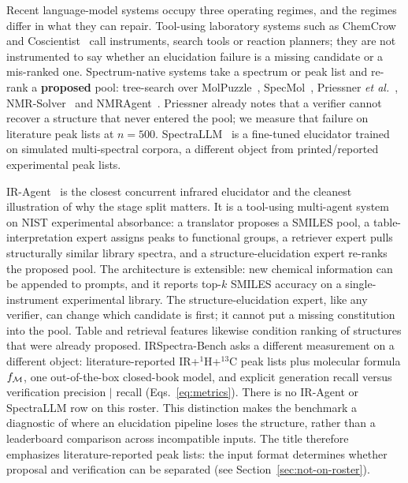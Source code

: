 \documentclass{article}
\begin{document}
Recent language-model systems occupy three operating regimes, and the
regimes differ in what they can repair.
Tool-using laboratory systems such as ChemCrow~\citep{mbran2024chemcrow}
and Coscientist~\citep{boiko2023coscientist} call instruments, search
tools or reaction planners; they are not instrumented to say whether an
elucidation failure is a missing candidate or a mis-ranked one.
Spectrum-native systems take a spectrum or peak list and re-rank a
\textbf{proposed} pool: tree-search over
MolPuzzle~\citep{zhuang2025treesearch}, SpecMol~\citep{shen2025specmol},
Priessner \textit{et al.}~\citep{priessner2026reasoning},
NMR-Solver~\citep{jin2025nmrsolver} and
NMRAgent~\citep{fang2026nmragent}.
Priessner already notes that a verifier cannot recover a structure that
never entered the pool; we measure that failure on literature peak lists
at $n{=}500$.
SpectraLLM~\citep{su2025spectrallm} is a fine-tuned elucidator trained on
simulated multi-spectral corpora, a different object from printed/reported
experimental peak lists.

IR-Agent~\citep{noh2025iragent} is the closest concurrent infrared
elucidator and the cleanest illustration of why the stage split matters.
It is a tool-using multi-agent system on NIST experimental absorbance: a
translator proposes a SMILES pool, a table-interpretation expert assigns
peaks to functional groups, a retriever expert pulls structurally similar
library spectra, and a structure-elucidation expert re-ranks the
proposed pool.
The architecture is extensible: new chemical information can be
appended to prompts, and it reports top-$k$ SMILES accuracy on a
single-instrument experimental library.
The structure-elucidation expert, like any verifier, can change which
candidate is first; it cannot put a missing constitution into the pool.
Table and retrieval features likewise condition ranking of structures
that were already proposed.
IRSpectra-Bench asks a different measurement on a different object:
literature-reported IR+$^1$H+$^{13}$C peak lists plus molecular formula $f_{\cal M}$, one
out-of-the-box closed-book model, and explicit generation recall versus
verification precision $|$ recall
(Eqs.~\ref{eq:metrics}).
There is no IR-Agent or SpectraLLM row on this roster. This distinction makes the benchmark a diagnostic of where an elucidation pipeline loses the structure, rather than a leaderboard comparison across incompatible inputs. The title therefore emphasizes literature-reported peak lists: the input format determines whether proposal and verification can be separated (see Section~\ref{sec:not-on-roster}).
\end{document}
